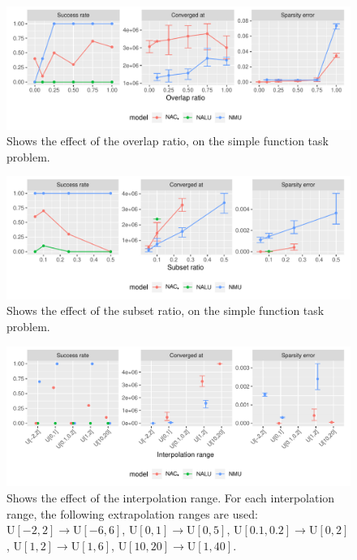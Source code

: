 \begin{figure}[h]
\centering
\includegraphics[width=\linewidth]{results/simple_function_static_overlap.pdf}
\caption{Shows the effect of the overlap ratio, on the simple function task problem.}
\label{fig:simple-fnction-static-overlap}
\end{figure}

\begin{figure}[h]
\centering
\includegraphics[width=\linewidth]{results/simple_function_static_subset.pdf}
\caption{Shows the effect of the subset ratio, on the simple function task problem.}
\label{fig:simple-fnction-static-subset}
\end{figure}

\begin{figure}[ht]
\centering
\includegraphics[width=\linewidth]{results/simple_function_static_range.pdf}
\caption{Shows the effect of the interpolation range. For each interpolation range, the following extrapolation ranges are used: ${\mathrm{U}[-2,2] \rightarrow \mathrm{U}[-6,6]}$, ${\mathrm{U}[0,1] \rightarrow \mathrm{U}[0,5]}$, ${\mathrm{U}[0.1,0.2] \rightarrow \mathrm{U}[0,2]}$, ${\mathrm{U}[1,2] \rightarrow \mathrm{U}[1,6]}$, ${\mathrm{U}[10, 20] \rightarrow \mathrm{U}[1, 40]}$.}
\label{fig:simple-fnction-static-range}
\end{figure}


